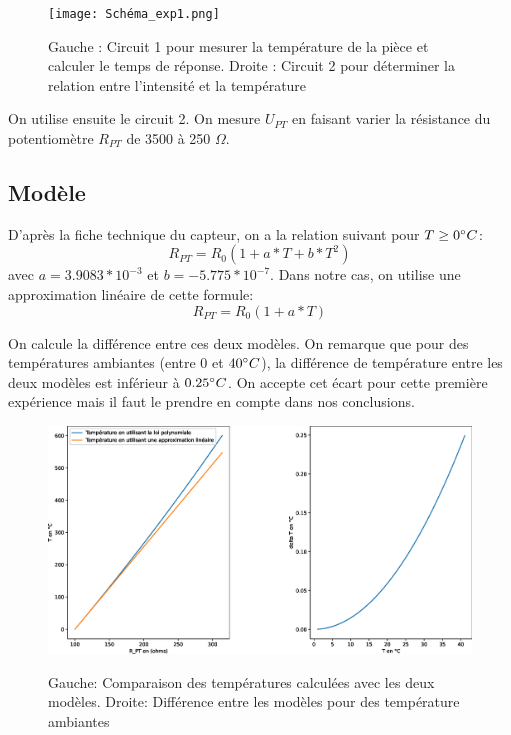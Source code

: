 \documentclass[12pt]{article}
\begin{document}
\newpage
\begin{figure}[h!]
	\begin{center}
		\texttt{[image: Schéma\_exp1.png]}
		\label{Schéma_exp1}
		\caption{Gauche : Circuit 1 pour mesurer la température de la pièce et calculer le temps de réponse. Droite : Circuit 2 pour déterminer la relation entre l'intensité et la température}
	\end{center}
\end{figure}

On utilise ensuite le circuit 2. On mesure $U_{PT}$ en faisant varier la résistance du potentiomètre $R_{PT}$ de 3500 à 250 $\Omega$.

\subsection{Modèle}
D'après la fiche technique du capteur, on a la relation suivant pour $T\geq 0\degree C$:
\begin{equation}
R_{PT}=R_0(1+a*T+b*T^2)
\end{equation}
avec $a=3.9083*10^{-3}$ et $b=-5.775*10^{-7}$. Dans notre cas, on utilise une approximation linéaire de cette formule:
\begin{equation}
R_{PT}=R_0(1+a*T)
\label{Modèle_linéaire}
\end{equation}

On calcule la différence entre ces deux modèles. On remarque que pour des températures ambiantes (entre $0$ et $40\degree C$), la différence de température entre les deux modèles est inférieur à $0.25\degree C$. On accepte cet écart pour cette première expérience mais il faut le prendre en compte dans nos conclusions. 
\begin{figure}[h!]
	\begin{center}
		\includegraphics[scale=0.3]{Comparaison.eps}
		\label{Comparaison}
		\caption{Gauche: Comparaison des températures calculées avec les deux modèles. Droite: Différence entre les modèles pour des température ambiantes}
	\end{center}
\end{figure}
\end{document}
